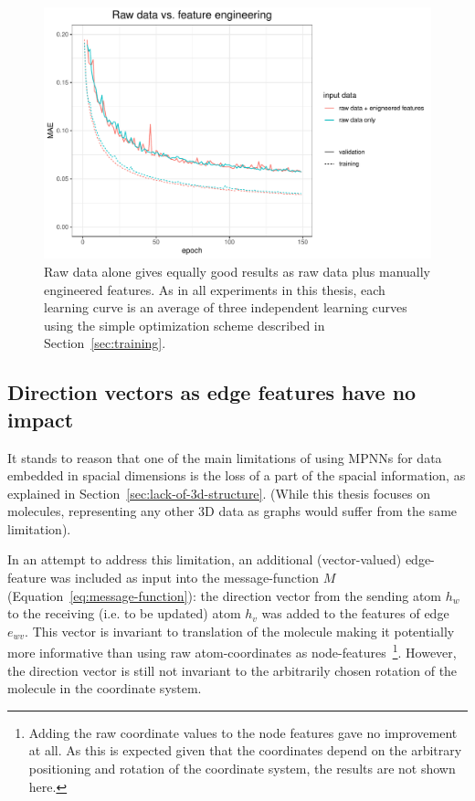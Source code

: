 \begin{figure}[H]
	\includegraphics[width=\linewidth]{figures/raw-data}
	\caption{Raw data alone gives equally good results as raw data plus manually engineered features. As in all experiments in this thesis, each learning curve is an average of three independent learning curves using the simple optimization scheme described in Section~\ref{sec:training}.}
	\label{fig:raw-data}
\end{figure}




\subsection{Direction vectors as edge features have no impact}
\label{sec:direction-vectors}

It stands to reason that one of the main limitations of using MPNNs for data embedded in spacial dimensions is the loss of a part of the spacial information, as explained in Section~\ref{sec:lack-of-3d-structure}. (While this thesis focuses on molecules, representing any other 3D data as graphs would suffer from the same limitation).
	
In an attempt to address this limitation, an additional (vector-valued) edge-feature was included as input into the message-function $M$ (Equation~\ref{eq:message-function}): the direction vector from the sending atom $h_w$ to the receiving (i.e. to be updated) atom $h_v$ was added to the features of edge $e_{wv}$. This vector is invariant to translation of the molecule making it potentially more informative than using raw atom-coordinates as node-features~\footnote{
	Adding the raw coordinate values to the node features gave no improvement at all. As this is expected given that the coordinates depend on the arbitrary positioning and rotation of the coordinate system, the results are not shown here.
}. However, the direction vector is still not invariant to the arbitrarily chosen rotation of the molecule in the coordinate system.

